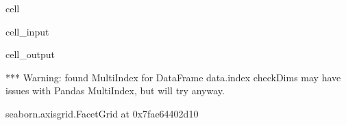\documentclass[letterpaper,table,10pt,english]{jupyterBook}
\begin{document}
\begin{sphinxuseclass}{cell}\begin{sphinxVerbatimInput}

\begin{sphinxuseclass}{cell_input}
\begin{sphinxVerbatim}[commandchars=\\\{\}]
  
     
                 
                     
\end{sphinxVerbatim}

\end{sphinxuseclass}\end{sphinxVerbatimInput}
\begin{sphinxVerbatimOutput}

\begin{sphinxuseclass}{cell_output}
\begin{sphinxVerbatim}[commandchars=\\\{\}]
*** Warning: found MultiIndex for DataFrame data.index \PYGZhy{} checkDims may have issues with Pandas MultiIndex, but will try anyway.
\end{sphinxVerbatim}

\begin{sphinxVerbatim}[commandchars=\\\{\}]
\PYGZlt{}seaborn.axisgrid.FacetGrid at 0x7fae64402d10\PYGZgt{}
\end{sphinxVerbatim}

\noindent{}

\end{sphinxuseclass}\end{sphinxVerbatimOutput}

\end{sphinxuseclass}
\end{document}
